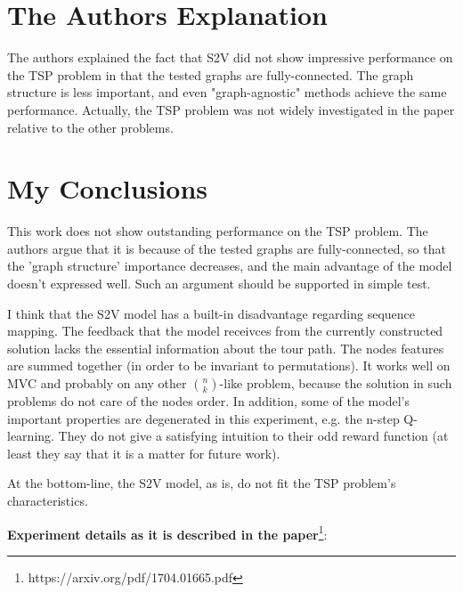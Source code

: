 \documentclass[10pt,a4paper,draft]{article}
\begin{document}
\section*{The Authors Explanation}
	The authors explained the fact that S2V did not show impressive performance on the TSP problem in that the tested graphs are fully-connected. The graph structure is less important, and even "graph-agnostic" methods achieve the same performance. 
	Actually, the TSP problem was not widely investigated in the paper relative to the other problems.

\section*{My Conclusions}
	This work does not show outstanding performance on the TSP problem. The authors argue that it is because of the tested graphs are fully-connected, so that the 'graph structure' importance decreases, and the main advantage of the model doesn't expressed well. Such an argument should be supported in simple test. 
	
	I think that the S2V model has a built-in disadvantage regarding sequence mapping. The feedback that the model receivces from the currently constructed solution lacks the essential information about the tour path. The nodes features are summed together (in order to be invariant to permutations). It works well on MVC and probably on any other ${n \choose k}$-like problem, because the solution in such problems do not care of the nodes order. 
	In addition, some of the model's important properties are degenerated in this experiment, e.g. the n-step Q-learning. They do not give a satisfying intuition to their odd reward function (at least they say that it is a matter for future work).
	
	At the bottom-line, the S2V model, as is, do not fit the TSP problem's characteristics. 


\textbf{Experiment details as it is described in the paper}\footnote{https://arxiv.org/pdf/1704.01665.pdf}: \\



\end{document}
